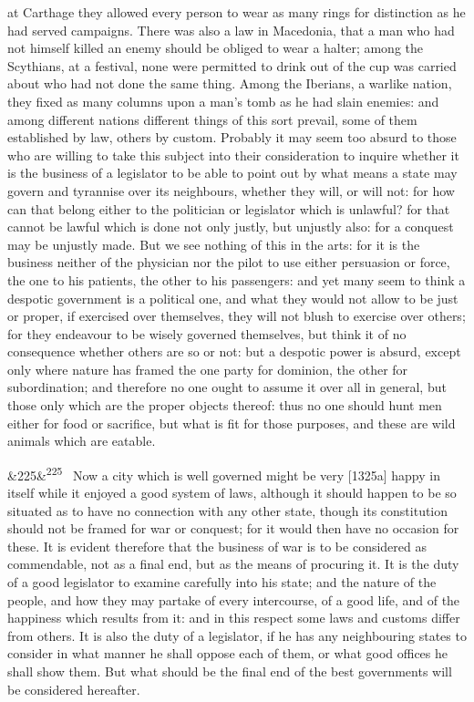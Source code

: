 \documentclass[12pt]{article}
\newcommand{\para}[1][]{\par\noindent\ifx&#1&\else\textsuperscript{\footnotesize #1}~\fi}
\begin{document}
at Carthage they allowed every person to wear as many rings for distinction as he had served campaigns. There was also a law in Macedonia, that a man who had not himself killed an enemy should be obliged to wear a halter; among the Scythians, at a festival, none were permitted to drink out of the cup was carried about who had not done the same thing. Among the Iberians, a warlike nation, they fixed as many columns upon a man's tomb as he had slain enemies: and among different nations different things of this sort prevail, some of them established by law, others by custom. Probably it may seem too absurd to those who are willing to take this subject into their consideration to inquire whether it is the business of a legislator to be able to point out by what means a state may govern and tyrannise over its neighbours, whether they will, or will not: for how can that belong either to the politician or legislator which is unlawful? for that cannot be lawful which is done not only justly, but unjustly also: for a conquest may be unjustly made. But we see nothing of this in the arts: for it is the business neither of the physician nor the pilot to use either persuasion or force, the one to his patients, the other to his passengers: and yet many seem to think a despotic government is a political one, and what they would not allow to be just or proper, if exercised over themselves, they will not blush to exercise over others; for they endeavour to be wisely governed themselves, but think it of no consequence whether others are so or not: but a despotic power is absurd, except only where nature has framed the one party for dominion, the other for subordination; and therefore no one ought to assume it over all in general, but those only which are the proper objects thereof: thus no one should hunt men either for food or sacrifice, but what is fit for those purposes, and these are wild animals which are eatable.

\para[225] Now a city which is well governed might be very [1325a] happy in itself while it enjoyed a good system of laws, although it should happen to be so situated as to have no connection with any other state, though its constitution should not be framed for war or conquest; for it would then have no occasion for these. It is evident therefore that the business of war is to be considered as commendable, not as a final end, but as the means of procuring it. It is the duty of a good legislator to examine carefully into his state; and the nature of the people, and how they may partake of every intercourse, of a good life, and of the happiness which results from it: and in this respect some laws and customs differ from others. It is also the duty of a legislator, if he has any neighbouring states to consider in what manner he shall oppose each of them, or what good offices he shall show them. But what should be the final end of the best governments will be considered hereafter.
\end{document}
